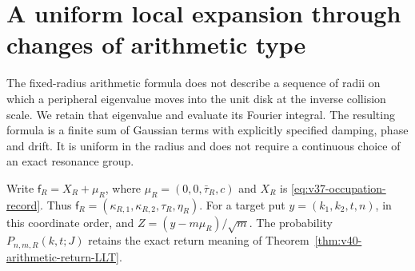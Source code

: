 \section{A uniform local expansion through changes of arithmetic type}
\label{sec:v41-transition}
The fixed-radius arithmetic formula does not describe a sequence of
radii on which a peripheral eigenvalue moves into the unit disk at the
inverse collision scale. We retain that eigenvalue and evaluate its
Fourier integral. The resulting formula is a finite sum of Gaussian
terms with explicitly specified damping, phase and drift. It is uniform
in the radius and does not require a continuous choice of an exact
resonance group.

Write $\mathsf f_R=X_R+\mu_R$, where
$\mu_R=(0,0,\bar\tau_R,c)$ and $X_R$ is
\eqref{eq:v37-occupation-record}. Thus
$\mathsf f_R=(\kappa_{R,1},\kappa_{R,2},\tau_R,\eta_R)$.
For a target put $y=(k_1,k_2,t,n)$, in this coordinate order, and
$Z=(y-m\mu_R)/\sqrt m$. The probability
$P_{n,m,R}(k,t;J)$ retains the exact return meaning of
Theorem~\ref{thm:v40-arithmetic-return-LLT}.

